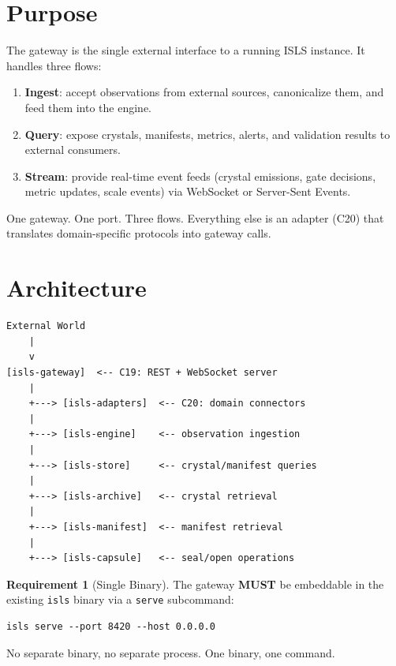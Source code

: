 \documentclass[11pt,a4paper,twoside]{article}
\theoremstyle{definition}
\newtheorem{requirement}{Requirement}[section]
\theoremstyle{plain}
\theoremstyle{remark}
\newcommand{\ISLS}{\textsf{ISLS}}
\begin{document}
\section{Purpose}\label{sec:gw:purpose}

The gateway is the single external interface to a running \ISLS{}
instance. It handles three flows:

\begin{enumerate}[nosep,label=(\alph*)]
  \item \textbf{Ingest}: accept observations from external sources,
        canonicalize them, and feed them into the engine.
  \item \textbf{Query}: expose crystals, manifests, metrics, alerts,
        and validation results to external consumers.
  \item \textbf{Stream}: provide real-time event feeds (crystal
        emissions, gate decisions, metric updates, scale events) via
        WebSocket or Server-Sent Events.
\end{enumerate}

One gateway. One port. Three flows. Everything else is an adapter
(C20) that translates domain-specific protocols into gateway calls.


\section{Architecture}\label{sec:gw:arch}

\begin{lstlisting}[title={Gateway Position in the Stack}]
External World
    |
    v
[isls-gateway]  <-- C19: REST + WebSocket server
    |
    +---> [isls-adapters]  <-- C20: domain connectors
    |
    +---> [isls-engine]    <-- observation ingestion
    |
    +---> [isls-store]     <-- crystal/manifest queries
    |
    +---> [isls-archive]   <-- crystal retrieval
    |
    +---> [isls-manifest]  <-- manifest retrieval
    |
    +---> [isls-capsule]   <-- seal/open operations
\end{lstlisting}

\begin{requirement}[Single Binary]\label{req:singlebin}
The gateway \textbf{MUST} be embeddable in the existing \texttt{isls}
binary via a \texttt{serve} subcommand:
\begin{lstlisting}
isls serve --port 8420 --host 0.0.0.0
\end{lstlisting}
No separate binary, no separate process. One binary, one command.
\end{requirement}
\end{document}
